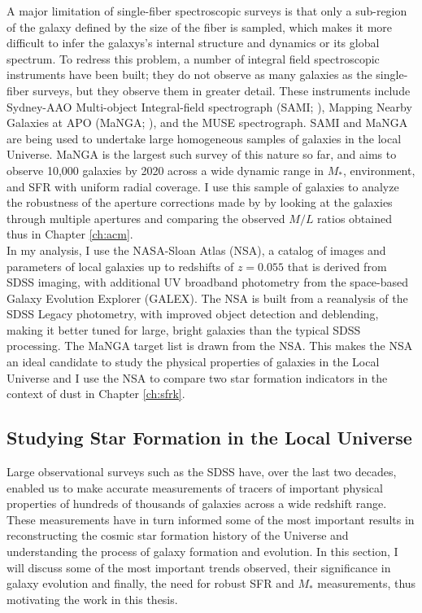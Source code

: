 A major limitation of single-fiber spectroscopic surveys is that only
a sub-region of the galaxy defined by the size of the fiber is
sampled, which makes it more difficult to infer the galaxys's internal
structure and dynamics or its global spectrum. To redress this
problem, a number of integral field spectroscopic instruments have
been built; they do not observe as many galaxies as the single-fiber
surveys, but they observe them in greater detail. These instruments
include Sydney-AAO Multi-object Integral-field spectrograph (SAMI;
\citealt{bryant_sami_2015}), Mapping Nearby Galaxies at APO (MaNGA;
\citealt{bundy_overview_2014}), and the MUSE spectrograph. SAMI and
MaNGA are being used to undertake large homogeneous samples of
galaxies in the local Universe.  MaNGA is the largest such survey of
this nature so far, and aims to observe 10,000 galaxies by 2020 across
a wide dynamic range in $M_{*}$, environment, and SFR with uniform
radial coverage.  I use this sample of galaxies to analyze the
robustness of the aperture corrections made by
\citet{kauffmann_environmental_2004} by looking at the galaxies
through multiple apertures and comparing the observed $M/L$ ratios
obtained thus in Chapter \ref{ch:acm}.\\

In my analysis, I use the NASA-Sloan Atlas (NSA), a catalog of images
and parameters of local galaxies up to redshifts of $z = 0.055$ that
is derived from SDSS imaging, with additional UV broadband photometry
from the space-based Galaxy Evolution Explorer (GALEX). The NSA is
built from a reanalysis \citet{2011AJ....142...31B} of the SDSS Legacy
photometry, with improved object detection and deblending, making it
better tuned for large, bright galaxies than the typical SDSS
processing. The MaNGA target list is drawn from the NSA. This makes
the NSA an ideal candidate to study the physical properties of
galaxies in the Local Universe and I use the NSA to compare two star
formation indicators in the context of dust in Chapter
\ref{ch:sfrk}.\\

\subsection{Studying Star Formation in the Local Universe}
\label{sec: results}

Large observational surveys such as the SDSS have, over the last two
decades, enabled us to make accurate measurements of tracers of
important physical properties of hundreds of thousands of galaxies
across a wide redshift range. These measurements have in turn informed
some of the most important results in reconstructing the cosmic star
formation history of the Universe and understanding the process of
galaxy formation and evolution. In this section, I will discuss some
of the most important trends observed, their significance in galaxy
evolution and finally, the need for robust SFR and $M_{*}$
measurements, thus motivating the work in this thesis.\\


